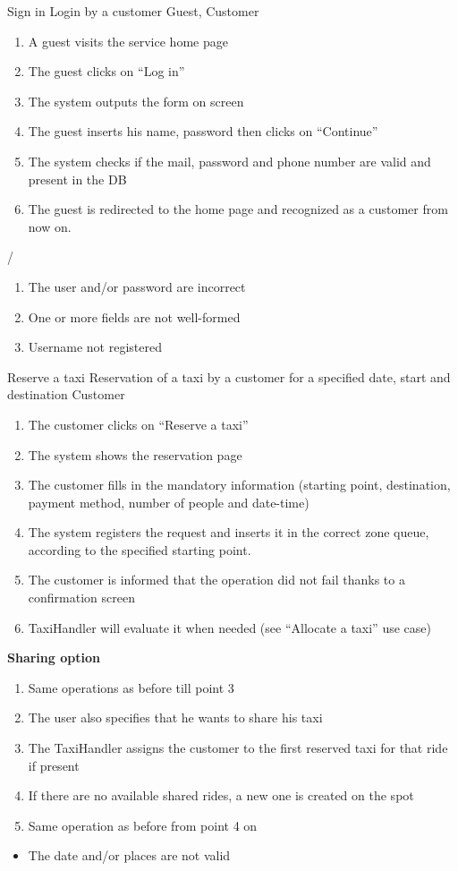 
\usecase
{Sign in}
{Login by a customer}
{Guest, Customer}
{
\begin{enumerate}
	\item A guest visits the service home page
	\item The guest clicks on ``Log in''
	\item The system outputs the form on screen
	\item The guest inserts his name, password then clicks on ``Continue''
	\item The system checks if the mail, password and phone number are valid and present in the DB
	\item The guest is redirected to the home page and recognized as a customer from now on.
\end{enumerate}
}
{
/
}
{ \begin{enumerate}
	\item The user and/or password are incorrect
	\item One or more fields are not well-formed
	\item Username not registered
\end{enumerate} }


\usecase
{Reserve a taxi}
{Reservation of a taxi by a customer for a specified date, start and destination}
{Customer}
{
\begin{enumerate}
	\item The customer clicks on ``Reserve a taxi''
	\item The system shows the reservation page
	\item The customer fills in the mandatory information (starting point, destination, payment method, number of people and date-time)
	\item The system registers the request and inserts it in the correct zone queue, according to the specified starting point.
	\item The customer is informed that the operation did not fail thanks to a confirmation screen
	\item TaxiHandler will evaluate it when needed (see ``Allocate a taxi'' use case)
\end{enumerate}
}
{
\textbf{Sharing option}
\begin{enumerate}
	\item Same operations as before till point 3
	\item The user also specifies that he wants to share his taxi
	\item The TaxiHandler assigns the customer to the first reserved taxi for that ride if present
	\item If there are no available shared rides, a new one is created on the spot
	\item Same operation as before from point 4 on
\end{enumerate}
}
{ 
\begin{itemize}
	\item The date and/or places are not valid
\end{itemize}
}

